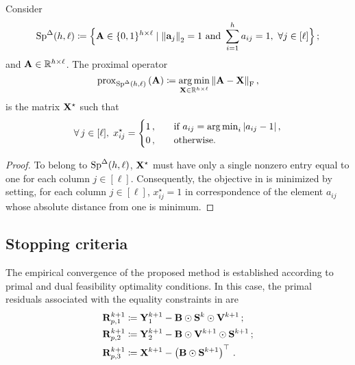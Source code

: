 \begin{lemma}\label{lemma:proximal_spDelta}
    Consider 
    \begin{equation}\label{eq:spDelta}
        \mathrm{Sp}^{\Delta}({h},{\ell}) \coloneqq \Big\{\mathbf{A} \in \{0,1\}^{h\times\ell} \mid  \norm{\mathbf{a}_j}_2=1 \text{ and }\\
        \sum_{i=1}^h a_{ij}=1,\,\,\forall j \in [\ell]  \Big\}\,;
\end{equation}
    and $\mathbf{A} \in \mathbb{R}^{h \times \ell}$.
    The proximal operator 
    \begin{equation}\label{eq:proximal_spDelta}
        \mathrm{prox}_{\mathrm{Sp}^{\Delta}({h},{\ell})}\left(\mathbf{A}\right)\coloneqq \operatorname*{arg\,min}_{\mathbf{X} \in \mathbb{R}^{h \times \ell}} \norm{\mathbf{A} - \mathbf{X}}_{\mathrm{F}}\,,    
    \end{equation}
     is the matrix $\mathbf{X}^\star$ such that
    \begin{equation}
        \forall \, j \in [\ell], \; x_{ij}^\star = \begin{cases}
            1\,, \quad &\text{if } a_{ij} = \operatorname*{arg\,min}_{i} \abs{a_{ij}-1}\,,\\
            0\,, & \text{otherwise.}
        \end{cases}
    \end{equation}
\end{lemma}
\begin{proof}
    To belong to $\mathrm{Sp}^{\Delta}({h},{\ell})$, $\mathbf{X}^\star$ must have only a single nonzero entry equal to one for each column $j \in [\ell]$.
    Consequently, the objective in  is minimized by setting, for each column $j\in [\ell]$, $x_{ij}^\star=1$ in correspondence of the element $a_{ij}$ whose absolute distance from one is minimum.
\end{proof}

\subsection{Stopping criteria}\label{subsec:stopping_criteria_partial}
The empirical convergence of the proposed method is established according to primal and dual feasibility optimality conditions.
In this case, the primal residuals associated with the equality constraints in  are
\begin{equation}\label{eq:primal_res_partial}
    \begin{aligned}
        \mathbf{R}_{p,1}^{k+1}&\coloneqq\mathbf{Y}_1^{k+1}-\mathbf{B}\odot\mathbf{S}^{k}\odot\mathbf{V}^{k+1}\,;\\
        \mathbf{R}_{p,2}^{k+1}&\coloneqq\mathbf{Y}_2^{k+1}-\mathbf{B}\odot\mathbf{V}^{k+1}\odot\mathbf{S}^{k+1}\,;\\
        \mathbf{R}_{p,3}^{k+1}&\coloneqq \mathbf{X}^{k+1} - \left(\mathbf{B} \odot \mathbf{S}^{k+1}\right)^\top\,.
    \end{aligned}
\end{equation}

